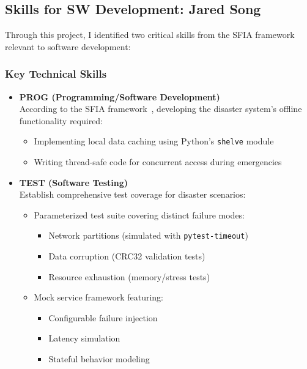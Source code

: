 \documentclass[a4paper, 11pt]{report}
\begin{document}
\newpage

\subsection{Skills for SW Development: Jared Song}
Through this project, I identified two critical skills from the SFIA framework relevant to software development:

\subsubsection{Key Technical Skills}
\begin{itemize}
    \item \textbf{PROG (Programming/Software Development)} \\
    According to the SFIA framework~\cite{sfia}, developing the disaster system's offline functionality required:
    \begin{itemize}
        \item Implementing local data caching using Python's \texttt{shelve} module
        \item Writing thread-safe code for concurrent access during emergencies
    \end{itemize}

    \item \textbf{TEST (Software Testing)} \\
    Establish comprehensive test coverage for disaster scenarios:
    \begin{itemize}
        \item Parameterized test suite covering distinct failure modes:
        \begin{itemize}
            \item Network partitions (simulated with \texttt{pytest-timeout})
            \item Data corruption (CRC32 validation tests)
            \item Resource exhaustion (memory/stress tests)
        \end{itemize}

        \item Mock service framework featuring:
        \begin{itemize}
            \item Configurable failure injection 
            \item Latency simulation 
            \item Stateful behavior modeling
        \end{itemize}
    \end{itemize}
\end{itemize}
\end{document}

